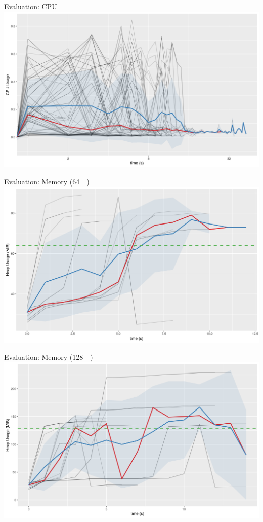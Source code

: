 \documentclass{beamer}
\begin{document}
\begin{frame}{Evaluation: CPU}
  \includegraphics[width=\textwidth]{../../plots/cpu_experiment.png}
\end{frame}

\begin{frame}{Evaluation: Memory (\SI{64}{\mebi\byte})}
  \includegraphics[width=\textwidth]{../../plots/heap_64.png}
\end{frame}

\begin{frame}{Evaluation: Memory (\SI{128}{\mebi\byte})}
  \includegraphics[width=\textwidth]{../../plots/heap_128.png}
\end{frame}
\end{document}
